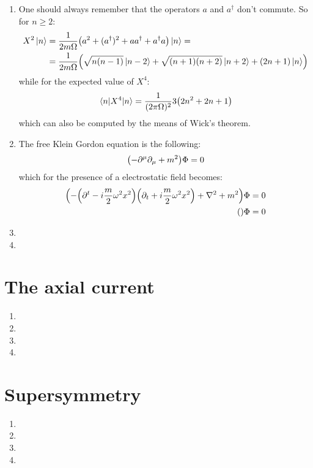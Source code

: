 \documentclass[11pt, oneside]{article}   	%
\begin{document}
\begin{enumerate}[label=\alph*)]

\item One should always remember that the operators $a$ and $a^\dagger$ don't commute. So for $n\ge2$:
\begin{align*}
	X^2 \ket{n} &= \frac{1}{2m\Omega} \qty(a^2 + (a^\dagger )^2 + a a^\dagger + a^\dagger a ) \ket{n} =  \\
	&= \frac{1}{2m\Omega} \qty( \sqrt{n(n-1)}\ket{n-2} + \sqrt{(n+1)(n+2)} \ket{n+2} + (2n+1) \ket{n})
\end{align*}
while for the expected value of $X^4$:
\[
	\mel{n}{X^4}{n} =  \frac{1}{(2\pi \Omega)^2} 3 \qty(2n^2 + 2n +1)
\]
which can also be computed by the means of Wick's theorem.

\item The free Klein Gordon equation is the following:
\[
	\qty(- \partial^\mu \partial_\mu + m^2) \Phi = 0
\]
which for the presence of a electrostatic field becomes:
\begin{align*}
	\qty(-\qty(\partial^t - i \frac{m}{2}\omega^2 x^2) \qty(\partial_t + i\frac{m}{2} \omega^2 x^2) + \laplacian + m^2) \Phi &= 0 \\
	\qty(  )\Phi &= 0 
\end{align*}

\item

\item

\end{enumerate}

\section{The axial current}

\begin{enumerate}[label=\alph*)]

\item

\item

\item

\item

\end{enumerate}

\section{Supersymmetry}

\begin{enumerate}[label=\alph*)]

\item

\item

\item

\item

\end{enumerate}
\end{document}

